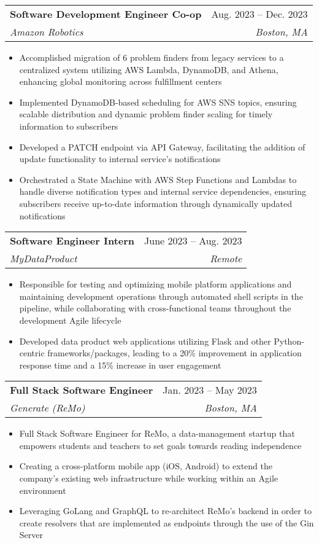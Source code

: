 \documentclass[letterpaper,8pt]{article}
\makeatletter
\newcommand{\resumeItem}[1]{
  \item\small{
    {#1 \vspace{-2pt}}
  }
}
\newcommand{\resumeSubheading}[4]{
  \vspace{-2pt}\item
    \begin{tabular*}{0.97\textwidth}[t]{l@{\extracolsep{\fill}}r}
      \textbf{#1} & #2 \\
      \textit{\small#3} & \textit{\small #4} \\
    \end{tabular*}\vspace{-7pt}
}
\newcommand{\resumeItemListStart}{\begin{itemize}}
\newcommand{\resumeItemListEnd}{\end{itemize}\vspace{-5pt}}
\makeatother
\begin{document}
    \resumeSubheading
      {Software Development Engineer Co-op}{Aug. 2023 -- Dec. 2023}
      {Amazon Robotics}{Boston, MA}
      \resumeItemListStart
      \resumeItem{Accomplished migration of 6 problem finders from legacy services to a centralized system utilizing AWS Lambda, DynamoDB, and Athena, enhancing global monitoring across fulfillment centers}
      \resumeItem{Implemented DynamoDB-based scheduling for AWS SNS topics, ensuring scalable distribution and dynamic problem finder scaling for timely information to subscribers}
      \resumeItem{Developed a PATCH endpoint via API Gateway, facilitating the addition of update functionality to internal service's notifications}
      \resumeItem{Orchestrated a State Machine with AWS Step Functions and Lambdas to handle diverse notification types and internal service dependencies, ensuring subscribers receive up-to-date information through dynamically updated notifications}
      \resumeItemListEnd

     \resumeSubheading
      {Software Engineer Intern}{June 2023 -- Aug. 2023}
      {MyDataProduct}{Remote}
      \resumeItemListStart
        \resumeItem{Responsible for testing and optimizing mobile platform applications and maintaining development operations through automated shell scripts in the pipeline, while collaborating with cross-functional teams throughout the development Agile lifecycle}
        \resumeItem{Developed data product web applications utilizing Flask and other Python-centric frameworks/packages, leading to a 20\% improvement in application response time and a 15\% increase in user engagement}
      \resumeItemListEnd

    \resumeSubheading
      {Full Stack Software Engineer}{Jan. 2023 -- May 2023}
      {Generate (ReMo)}{Boston, MA}
      \resumeItemListStart
        \resumeItem{Full Stack Software Engineer for ReMo, a data-management startup that empowers students and teachers to set goals towards reading independence}
        \resumeItem{Creating a cross-platform mobile app (iOS, Android) to extend the company’s existing web infrastructure while working within an Agile environment}
        \resumeItem{Leveraging GoLang and GraphQL to re-architect ReMo’s backend in order to create resolvers that are implemented as endpoints through the use of the Gin Server}
      \resumeItemListEnd

\end{document}
